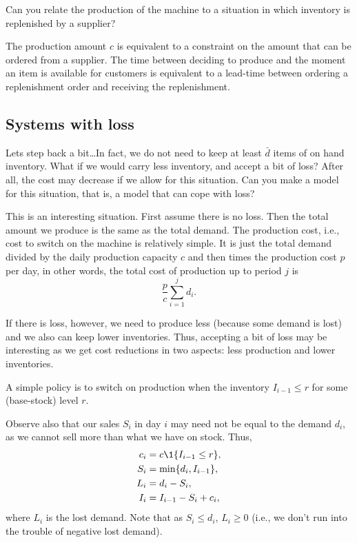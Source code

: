 \begin{question}
  Can you relate the production of the machine to a situation in which
  inventory is replenished by a supplier?
  \begin{solution}
    The production amount $c$ is equivalent to a constraint on the
    amount that can be ordered from a supplier. The time between
    deciding to produce and the moment an item is available for
    customers is equivalent to a lead-time between ordering a
    replenishment order and receiving the replenishment.
  \end{solution}
\end{question}

\subsection{Systems with loss}
\label{sec:real-that-prev}

\begin{question}
  Lets step back a bit\ldots In fact, we do not need to keep at least
  $\bar d$ items of on hand inventory. What if we would carry less
  inventory, and accept a bit of loss?  After all, the cost may
  decrease if we allow for this situation. Can you make a model for
  this situation, that is, a model that can cope with loss?
  \begin{solution}
    This is an interesting situation. First assume there is no
    loss. Then the total amount we produce is the same as the total
    demand. The production cost, i.e., cost to switch on the machine
    is relatively simple. It is just the total demand divided by the
    daily production capacity $c$ and then times the production cost
    $p$ per day, in other words, the total cost of production up to period $j$ is
    \begin{equation*}
    \frac{p}c\sum_{i=1}^j d_i.
    \end{equation*}

    If there is loss, however, we need to produce less (because some
    demand is lost) and we also can keep lower inventories. Thus,
    accepting a bit of loss may be interesting as we get cost
    reductions in two aspects: less production and lower inventories.

    A simple policy is to switch on production when the inventory
    $I_{i-1}\leq r$ for some (base-stock) level $r$. 

Observe also that our sales $S_i$ in day $i$ may need not be equal to the demand $d_i$,  as we cannot sell more than what we have on stock. Thus,
    \begin{align*}
      c_i &= c \1{I_{i-1} \leq r}, \\
      S_i &= \min\{d_i, I_{i-1}\}, \\
      L_i &= d_i - S_i, \\
      I_i &= I_{i-1} -S_i + c_i, 
    \end{align*}
    where $L_i$ is the lost demand. Note that as $S_i \leq d_i$,
    $L_i \geq 0$ (i.e., we don't run into the trouble of negative lost
    demand).
  \end{solution}
\end{question}

